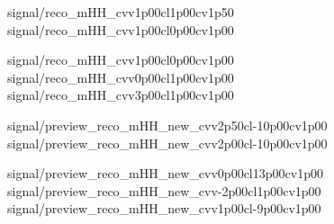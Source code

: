 
{signal/reco_mHH_cvv1p00cl1p00cv1p50}
{signal/reco_mHH_cvv1p00cl0p00cv1p00}

{signal/reco_mHH_cvv1p00cl0p00cv1p00}
{signal/reco_mHH_cvv0p00cl1p00cv1p00}
{signal/reco_mHH_cvv3p00cl1p00cv1p00}

{signal/preview_reco_mHH_new_cvv2p50cl-10p00cv1p00}
{signal/preview_reco_mHH_new_cvv2p00cl-10p00cv1p00}

{signal/preview_reco_mHH_new_cvv0p00cl13p00cv1p00}
{signal/preview_reco_mHH_new_cvv-2p00cl1p00cv1p00}
{signal/preview_reco_mHH_new_cvv1p00cl-9p00cv1p00}
